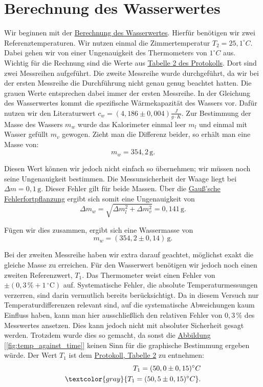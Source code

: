 \twocolumn

\section{Berechnung des Wasserwertes}
Wir beginnen mit der \hyperref[eq:wasserwert]{Berechnung des Wasserwertes}. 
Hierfür benötigen wir zwei Referenztemperaturen. Wir nutzen einmal die Zimmertemperatur $T_2 = 25,1 ^\circ C$. Dabei gehen wir von einer Ungenauigkeit des Thermometers von $1^\circ C$ aus.
Wichtig für die Rechnung sind die Werte aus \hyperref[Prtokoll]{Tabelle 2 des Protokolls}. Dort sind zwei Messreihen aufgeführt.
Die zweite Messreihe wurde durchgeführt, da wir bei der ersten Messreihe die Durchführung nicht genau genug beachtet hatten. Die grauen Werte entsprechen dabei immer der ersten Messreihe.
In der Gleichung des Wasserwertes kommt die spezifische Wärmekapazität des Wassers vor. Dafür nutzen wir den Literaturwert
$c_w = (4,186 \pm 0,004) \frac{J}{g \cdot K}$. Zur Bestimmung der Masse des Wassers $m_w$ wurde das Kalorimeter einmal leer $m_l$ und einmal mit Wasser gefüllt $m_v$ gewogen.
Zieht man die Differenz beider, so erhält man eine Masse von:
\begin{equation}
    m_w = 354,2 \, \mathrm{g}.
\end{equation}

Diesen Wert können wir jedoch nicht einfach so übernehmen; wir müssen noch seine Ungenauigkeit bestimmen. Die Messunsicherheit der Waage liegt bei $\Delta m = 0,1 \, \mathrm{g}$. Dieser Fehler gilt für beide Massen.
Über die \hyperref[eq:gauss_fehlfortpflanzung]{Gauß'sche Fehlerfortpflanzung} ergibt sich somit eine Ungenauigkeit von
\begin{equation}
    \Delta m_w = \sqrt{\Delta m_l^2 + \Delta m_v^2} = 0,141 \, \mathrm{g}.
\end{equation}

Fügen wir dies zusammen, ergibt sich eine Wassermasse von
\begin{equation}
    m_w = (354,2 \pm 0,14) \, \mathrm{g}.
\end{equation}

Bei der zweiten Messreihe haben wir extra darauf geachtet, möglichst exakt die gleiche Masse zu erreichen. 
Für den Wasserwert benötigen wir jedoch noch einen zweiten Referenzwert, $T_1$.
Das Thermometer weist einen Fehler von \(\pm(0{,}3\,\% + 1\,\mathrm{^\circ C})\) auf. Systematische Fehler, die absolute Temperaturmessungen verzerren, sind darin vermutlich bereits berücksichtigt. Da in diesem Versuch nur Temperaturdifferenzen relevant sind, auf die systematische Abweichungen kaum Einfluss haben, kann man hier ausschließlich den relativen Fehler von $0{,}3\,\%$ des Messwertes ansetzen.
Dies kann jedoch nicht mit absoluter Sicherheit gesagt werden. Trotzdem wurde dies so gemacht, da sonst die \hyperref[fig:temp_against_time]{Abbildung [\ref*{fig:temp_against_time}]} keinen Sinn für die graphische Bestimmung ergeben würde.
Der Wert $T_1$ ist dem \hyperref[Prtokoll]{Protokoll, Tabelle 2} zu entnehmen:
\begin{align}
    T_1 = (50,0 \pm 0,15)^\circ C \\ 
    \notag \textcolor{gray}{T_1 = (50,5 \pm 0,15)^\circ C}.
\end{align}

